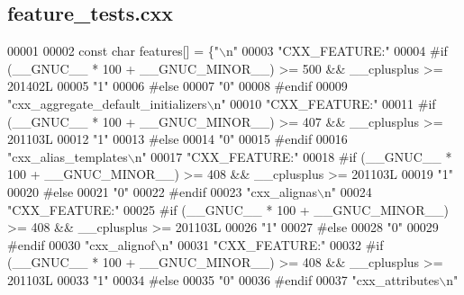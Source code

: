 \subsection{feature\+\_\+tests.\+cxx}
\label{gr-radar-dev_2build_2CMakeFiles_2feature__tests_8cxx_source}

\begin{DoxyCode}
00001 
00002   \textcolor{keyword}{const} \textcolor{keywordtype}{char} features[] = \{\textcolor{stringliteral}{"\(\backslash\)n"}
00003 \textcolor{stringliteral}{"CXX\_FEATURE:"}
00004 \textcolor{preprocessor}{#if (\_\_GNUC\_\_ * 100 + \_\_GNUC\_MINOR\_\_) >= 500 && \_\_cplusplus >= 201402L}
00005 \textcolor{stringliteral}{"1"}
00006 \textcolor{preprocessor}{#else}
00007 \textcolor{stringliteral}{"0"}
00008 \textcolor{preprocessor}{#endif}
00009 \textcolor{stringliteral}{"cxx\_aggregate\_default\_initializers\(\backslash\)n"}
00010 \textcolor{stringliteral}{"CXX\_FEATURE:"}
00011 \textcolor{preprocessor}{#if (\_\_GNUC\_\_ * 100 + \_\_GNUC\_MINOR\_\_) >= 407 && \_\_cplusplus >= 201103L}
00012 \textcolor{stringliteral}{"1"}
00013 \textcolor{preprocessor}{#else}
00014 \textcolor{stringliteral}{"0"}
00015 \textcolor{preprocessor}{#endif}
00016 \textcolor{stringliteral}{"cxx\_alias\_templates\(\backslash\)n"}
00017 \textcolor{stringliteral}{"CXX\_FEATURE:"}
00018 \textcolor{preprocessor}{#if (\_\_GNUC\_\_ * 100 + \_\_GNUC\_MINOR\_\_) >= 408 && \_\_cplusplus >= 201103L}
00019 \textcolor{stringliteral}{"1"}
00020 \textcolor{preprocessor}{#else}
00021 \textcolor{stringliteral}{"0"}
00022 \textcolor{preprocessor}{#endif}
00023 \textcolor{stringliteral}{"cxx\_alignas\(\backslash\)n"}
00024 \textcolor{stringliteral}{"CXX\_FEATURE:"}
00025 \textcolor{preprocessor}{#if (\_\_GNUC\_\_ * 100 + \_\_GNUC\_MINOR\_\_) >= 408 && \_\_cplusplus >= 201103L}
00026 \textcolor{stringliteral}{"1"}
00027 \textcolor{preprocessor}{#else}
00028 \textcolor{stringliteral}{"0"}
00029 \textcolor{preprocessor}{#endif}
00030 \textcolor{stringliteral}{"cxx\_alignof\(\backslash\)n"}
00031 \textcolor{stringliteral}{"CXX\_FEATURE:"}
00032 \textcolor{preprocessor}{#if (\_\_GNUC\_\_ * 100 + \_\_GNUC\_MINOR\_\_) >= 408 && \_\_cplusplus >= 201103L}
00033 \textcolor{stringliteral}{"1"}
00034 \textcolor{preprocessor}{#else}
00035 \textcolor{stringliteral}{"0"}
00036 \textcolor{preprocessor}{#endif}
00037 \textcolor{stringliteral}{"cxx\_attributes\(\backslash\)n"}

\end{DoxyCode}
